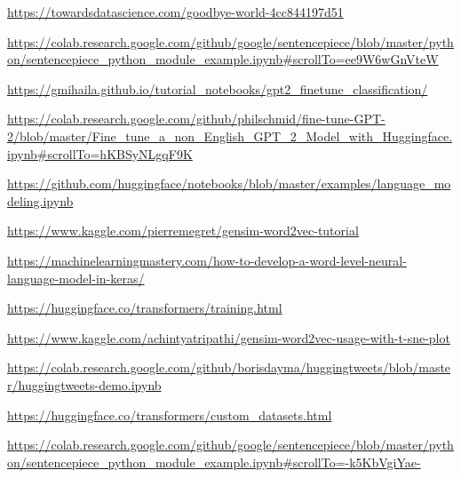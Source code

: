 \documentclass[12pt, a4paper]{article}
\begin{document}
\newpage



\begin{thebibliography}{9}
	\url{https://towardsdatascience.com/goodbye-world-4cc844197d51}
	
	\url{https://colab.research.google.com/github/google/sentencepiece/blob/master/python/sentencepiece_python_module_example.ipynb#scrollTo=ee9W6wGnVteW}
	
	\url{https://gmihaila.github.io/tutorial_notebooks/gpt2_finetune_classification/}
	
	\url{https://colab.research.google.com/github/philschmid/fine-tune-GPT-2/blob/master/Fine_tune_a_non_English_GPT_2_Model_with_Huggingface.ipynb#scrollTo=hKBSyNLgqF9K}
	
	\url{https://github.com/huggingface/notebooks/blob/master/examples/language_modeling.ipynb}
	
	\url{https://www.kaggle.com/pierremegret/gensim-word2vec-tutorial}
	
	\url{https://machinelearningmastery.com/how-to-develop-a-word-level-neural-language-model-in-keras/}
	
	\url{https://huggingface.co/transformers/training.html}
	
	\url{https://www.kaggle.com/achintyatripathi/gensim-word2vec-usage-with-t-sne-plot}
	
	\url{https://colab.research.google.com/github/borisdayma/huggingtweets/blob/master/huggingtweets-demo.ipynb}
	
	\url{https://huggingface.co/transformers/custom_datasets.html}
	
	\url{https://colab.research.google.com/github/google/sentencepiece/blob/master/python/sentencepiece_python_module_example.ipynb#scrollTo=-k5KbVgiYae-}
	
\end{thebibliography}
\end{document}
